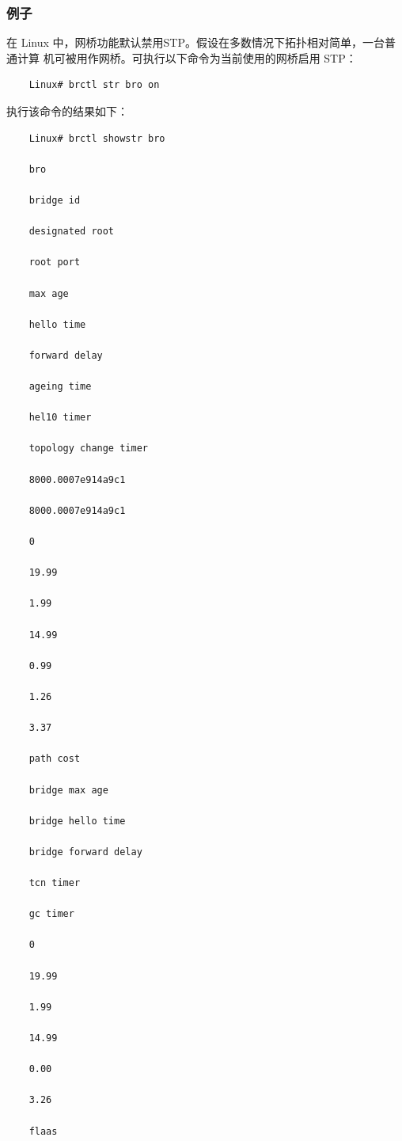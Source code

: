 \subsubsection{例子}

在 Linux 中，网桥功能默认禁用STP。假设在多数情况下拓扑相对简单，一台普通计算
机可被用作网桥。可执行以下命令为当前使用的网桥启用 STP：

\begin{verbatim}
    Linux# brctl str bro on
\end{verbatim}

执行该命令的结果如下：

\begin{verbatim}
    Linux# brctl showstr bro
    
    bro
    
    bridge id
    
    designated root
    
    root port
    
    max age
    
    hello time
    
    forward delay
    
    ageing time
    
    hel10 timer
    
    topology change timer
    
    8000.0007e914a9c1
    
    8000.0007e914a9c1
    
    0
    
    19.99
    
    1.99
    
    14.99
    
    0.99
    
    1.26
    
    3.37
    
    path cost
    
    bridge max age
    
    bridge hello time
    
    bridge forward delay
    
    tcn timer
    
    gc timer
    
    0
    
    19.99
    
    1.99
    
    14.99
    
    0.00
    
    3.26
    
    flaas
    

\end{verbatim}
